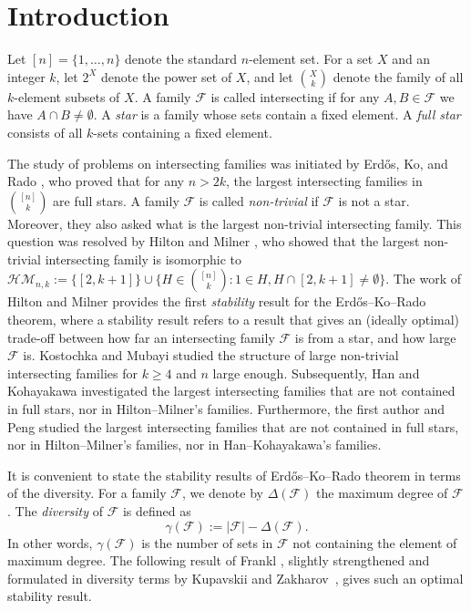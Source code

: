 \documentclass[11pt]{article}
\newcommand{\m}{\mathcal}
\begin{document}




\section{Introduction}
Let $[n]=\{1,\dots, n\}$ denote the standard $n$-element set. 
For a set $X$ and an integer $k$, let $2^{X}$ denote the power set of $X$, 
and let ${X\choose k}$ denote the family of all $k$-element subsets of $X$. A family $\mathcal{F}$ is called  intersecting if for any $A, B\in \m F$ we have $A\cap B\ne \emptyset$. A {\it star} is a family whose sets contain a fixed element. 
A {\it full star} consists of all $k$-sets containing a fixed element. 


The study of problems on intersecting families was initiated by Erd\H{o}s, Ko, and Rado \cite{EKR1961}, who proved that for any $n> 2k$, the largest intersecting families in ${[n]\choose k}$ are full stars. 
A family $\mathcal{F}$ is called {\it non-trivial} if $\mathcal{F}$ is not a star.  
Moreover, they also asked what is the largest non-trivial intersecting family. 
This question was resolved by Hilton and Milner \cite{HM1967}, who showed that the largest non-trivial intersecting family is  isomorphic  to $\mathcal{HM}_{n,k}:=\{ [2,k+1] \} \cup \{H\in \binom{[n]}{k}: 1\in H, H\cap [2,k+1] \neq \emptyset\}$.  
The work of Hilton and Milner \cite{HM1967} provides the first {\it stability} result for the Erd\H{o}s--Ko--Rado theorem, where a stability result refers to a result that gives an (ideally optimal) trade-off  between how far an intersecting family $\m F$ is from a star, and how large $\m F$ is.  
Kostochka and Mubayi \cite{KM2016}
studied the structure of large non-trivial intersecting families for $k\ge 4$ and $n$ large enough.
Subsequently,  Han and Kohayakawa \cite{HK2017} 
investigated the largest intersecting families that are not contained in full stars, nor in Hilton--Milner's families. Furthermore, 
the first author and Peng \cite{HP2024} studied the largest intersecting families that are not contained in full stars, nor in Hilton--Milner's families, nor in Han--Kohayakawa's families. 


It is convenient to state the stability results of Erd\H{o}s--Ko--Rado theorem in terms of the diversity. For a family $\mathcal{F}$, we denote by $\Delta(\mathcal{F})$ the maximum degree of $\mathcal{F}$. The {\it diversity} of $\m F$ is defined as 
\[ \gamma(\m F) := |\m F|-\Delta(\m F).  \] 
In other words, $\gamma (\m F)$ is the number of sets in $\m F$ not containing the element of maximum degree. The following result of Frankl \cite{Frankl-max-degree}, slightly strengthened and formulated in diversity terms by Kupavskii and Zakharov~\cite{KZ2018}, gives such an optimal stability result.
\end{document}
